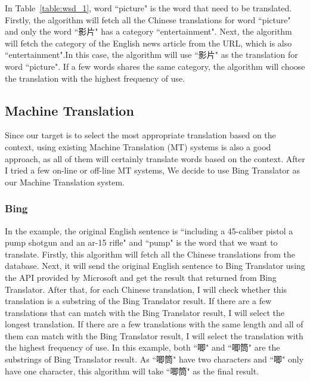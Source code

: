 \begin{CJK}{UTF8}{gbsn}
In Table~\ref{table:wsd_1}, word ``picture" is the word that need to be translated. Firstly, the algorithm will fetch all the Chinese translations for word ``picture" and only the word ``影片" has a category ``entertainment". Next, the algorithm will fetch the category of the English news article from the URL, which is also ``entertainment".In this case, the algorithm will use ``影片" as the translation for word ``picture". If a few words shares the same category, the algorithm will choose the translation with the highest frequency of use.

\subsection{Machine Translation}
Since our target is to select the most appropriate translation based on the context, using existing Machine Translation (MT) systems is also a good approach, as all of them will certainly translate words based on the context. After I tried a few on-line or off-line MT systems, We decide to use Bing Translator as our Machine Translation system.

\subsubsection{Bing}

In the example, the original English sentence is ``including a 45-caliber pistol a pump shotgun and an ar-15 rifle" and ``pump" is the word that we want to translate. Firstly, this algorithm will fetch all the Chinese translations from the database. Next, it will send the original English sentence to Bing Translator using the API provided by Microsoft and get the result that returned from Bing Translator. After that, for each Chinese translation, I will check whether this translation is a substring of the Bing Translator result. If there are a few translations that can match with the Bing Translator result, I will select the longest translation. If there are a few translations with the same length and all of them can match with the Bing Translator result, I will select the translation with the highest frequency of use. In this example, both ``唧" and ``唧筒" are the substrings of Bing Translator result. As ``唧筒" have two characters and ``唧" only have one character, this algorithm will take ``唧筒" as the final result.


\end{CJK}
